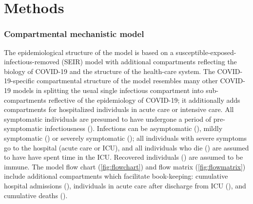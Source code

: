 \documentclass[12pt]{article}\usepackage[]{graphicx}\usepackage[]{color}
\begin{document}
\section{Methods}

\subsubsection*{Compartmental mechanistic model}

The epidemiological structure of the model is based on
a susceptible-exposed-infectious-removed (SEIR) model with
additional compartments reflecting the biology of COVID-19 and the
structure of the health-care system. The COVID-19-specific compartmental structure
of the model resembles many other COVID-19 models
in splitting the usual single infectious compartment into sub-compartments reflective
of the epidemiology of COVID-19; it additionally adds
compartments for hospitalized individuals in acute care
or intensive care. All symptomatic individuals are
presumed to have undergone a period of pre-symptomatic infectiousness
(). Infections can be
asymptomatic (), mildly symptomatic () or
severely symptomatic (); all individuals with severe symptoms
go to the hospital (acute care or ICU), and all individuals who die () are assumed to have
have spent time in the ICU.  Recovered individuals () are
assumed to be immune.  The model flow chart
(\cref{fig:flowchart}) and flow matrix (\cref{fig:flowmatrix})
include additional compartments which facilitate book-keeping:
cumulative hospital admissions (), individuals in acute care
after discharge from ICU (), and cumulative deaths
().
\end{document}
